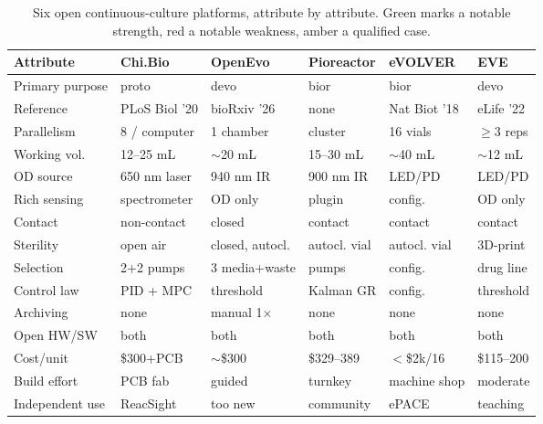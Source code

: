 \documentclass[11pt,a4paper]{article}
\begin{document}
\begin{table}[t]
\centering
\footnotesize
\renewcommand{\arraystretch}{1.25}
\caption{Six open continuous-culture platforms, attribute by attribute.
\textcolor{good}{Green} marks a notable strength, \textcolor{bad}{red} a notable weakness,
\textcolor{warn}{amber} a qualified case.}
\label{tab:matrix}
\begin{tabular}{@{}>{\RaggedRight}p{2.4cm} p{1.85cm} p{1.85cm} p{1.85cm} p{1.85cm} p{1.65cm}@{}}
\toprule
\textbf{Attribute} & \textbf{Chi.Bio} & \textbf{OpenEvo} & \textbf{Pioreactor} & \textbf{eVOLVER} & \textbf{EVE} \\
\midrule
Primary purpose & proto & devo & bior & bior & devo \\
Reference & PLoS Biol '20 & bioRxiv '26 & \textcolor{bad}{none} & Nat Biot '18 & eLife '22 \\
Parallelism & \textcolor{good}{8 / computer} & \textcolor{bad}{1 chamber} & \textcolor{good}{cluster} & \textcolor{good}{16 vials} & $\ge$3 reps \\
Working vol. & 12--25 mL & $\sim$20 mL & 15--30 mL & $\sim$40 mL & $\sim$12 mL \\
OD source & 650 nm laser & 940 nm IR & 900 nm IR & LED/PD & LED/PD \\
Rich sensing & \textcolor{good}{spectrometer} & \textcolor{bad}{OD only} & plugin & config. & \textcolor{bad}{OD only} \\
Contact & \textcolor{good}{non-contact} & closed & contact & contact & contact \\
Sterility & \textcolor{warn}{open air} & \textcolor{good}{closed, autocl.} & autocl. vial & autocl. vial & 3D-print \\
Selection & 2+2 pumps & \textcolor{good}{3 media+waste} & pumps & \textcolor{good}{config.} & drug line \\
Control law & \textcolor{good}{PID + MPC} & threshold & Kalman GR & config. & threshold \\
Archiving & \textcolor{bad}{none} & \textcolor{bad}{manual 1$\times$} & \textcolor{bad}{none} & \textcolor{bad}{none} & \textcolor{bad}{none} \\
Open HW/SW & \textcolor{good}{both} & \textcolor{good}{both} & \textcolor{good}{both} & \textcolor{good}{both} & \textcolor{good}{both} \\
Cost/unit & \$300+PCB & $\sim$\$300 & \$329--389 & \textcolor{warn}{$<$\$2k/16} & \textcolor{good}{\$115--200} \\
Build effort & \textcolor{warn}{PCB fab} & \textcolor{good}{guided} & \textcolor{good}{turnkey} & \textcolor{bad}{machine shop} & moderate \\
Independent use & ReacSight & \textcolor{warn}{too new} & \textcolor{warn}{community} & \textcolor{good}{ePACE} & teaching \\
\bottomrule
\end{tabular}
\end{table}
\end{document}
